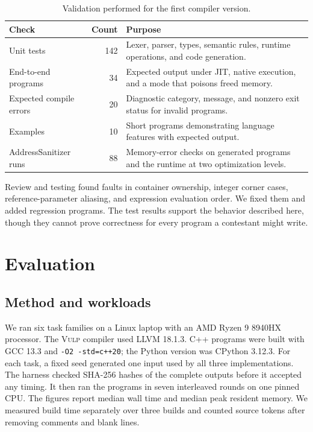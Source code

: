 \documentclass[12pt,a4paper]{report}
\newcommand{\vulp}{\textsc{Vulp}}
\begin{document}
\begin{table}[htbp]
\centering\small
\begin{tabular}{|>{\raggedright\arraybackslash}p{39mm}|r|>{\raggedright\arraybackslash}p{89mm}|}
\hline
Check & Count & Purpose\\\hline
Unit tests & 142 & Lexer, parser, types, semantic rules, runtime operations, and code generation.\\\hline
End-to-end programs & 34 & Expected output under JIT, native execution, and a mode that poisons freed memory.\\\hline
Expected compile errors & 20 & Diagnostic category, message, and nonzero exit status for invalid programs.\\\hline
Examples & 10 & Short programs demonstrating language features with expected output.\\\hline
AddressSanitizer runs & 88 & Memory-error checks on generated programs and the runtime at two optimization levels.\\\hline
\end{tabular}
\caption{Validation performed for the first compiler version.}
\label{tab:validation}
\end{table}

Review and testing found faults in container ownership, integer corner cases, reference-parameter aliasing, and expression evaluation order. We fixed them and added regression programs. The test results support the behavior described here, though they cannot prove correctness for every program a contestant might write.

\chapter{Evaluation}\label{sec:evaluation}
\section{Method and workloads}
We ran six task families on a Linux laptop with an AMD Ryzen 9 8940HX processor. The \vulp{} compiler used LLVM 18.1.3. C++ programs were built with GCC 13.3 and \texttt{-O2 -std=c++20}; the Python version was CPython 3.12.3. For each task, a fixed seed generated one input used by all three implementations. The harness checked SHA-256 hashes of the complete outputs before it accepted any timing. It then ran the programs in seven interleaved rounds on one pinned CPU. The figures report median wall time and median peak resident memory. We measured build time separately over three builds and counted source tokens after removing comments and blank lines.
\end{document}

